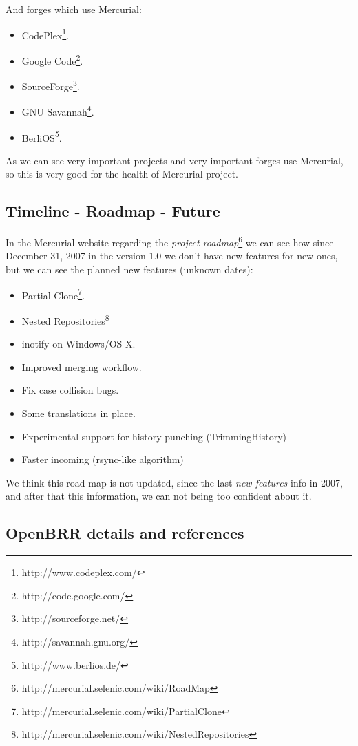 \documentclass[a4paper,10pt]{article}
\begin{document}
And forges which use Mercurial:
\begin{itemize}
 \item CodePlex\footnote{http://www.codeplex.com/}.
 \item Google Code\footnote{http://code.google.com/}.
 \item SourceForge\footnote{http://sourceforge.net/}.
 \item GNU Savannah\footnote{http://savannah.gnu.org/}.
 \item BerliOS\footnote{http://www.berlios.de/}.
\end{itemize}

As we can see very important projects and very important forges use Mercurial,
so this is very good for the health of Mercurial project.

\subsection{Timeline - Roadmap - Future}

In the Mercurial website regarding the \textit{project
roadmap}\footnote{http://mercurial.selenic.com/wiki/RoadMap} we can see how
since December 31, 2007 in the version 1.0 we don't have new features for new
ones, but we can see the planned new features (unknown dates):
\begin{itemize}
 \item Partial Clone\footnote{http://mercurial.selenic.com/wiki/PartialClone}.
 \item Nested
Repositories\footnote{http://mercurial.selenic.com/wiki/NestedRepositories}
 \item inotify on Windows/OS X.
 \item Improved merging workflow.
 \item Fix case collision bugs.
 \item Some translations in place.
 \item Experimental support for history punching (TrimmingHistory)
 \item Faster incoming (rsync-like algorithm) 
\end{itemize}

We think this road map is not updated, since the last \textit{new features}
info in 2007, and after that this information, we can not being too confident
about it.

\subsection{OpenBRR details and references}
\end{document}
